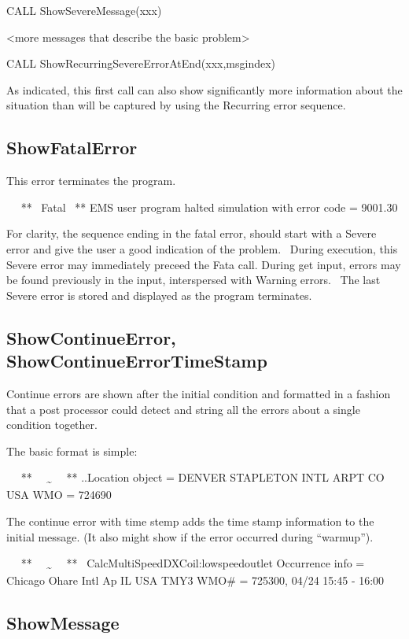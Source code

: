 CALL ShowSevereMessage(xxx)

\textless{}more messages that describe the basic problem\textgreater{}

CALL ShowRecurringSevereErrorAtEnd(xxx,msgindex)

As indicated, this first call can also show significantly more information about the situation than will be captured by using the Recurring error sequence.

\subsection{ShowFatalError}\label{showfatalerror}

This error terminates the program.

~~ **~ Fatal~ ** EMS user program halted simulation with error code = 9001.30

For clarity, the sequence ending in the fatal error, should start with a Severe error and give the user a good indication of the problem.~ During execution, this Severe error may immediately preceed the Fata call. During get input, errors may be found previously in the input, interspersed with Warning errors.~ The last Severe error is stored and displayed as the program terminates.

\subsection{ShowContinueError, ShowContinueErrorTimeStamp}\label{showcontinueerror-showcontinueerrortimestamp}

Continue errors are shown after the initial condition and formatted in a fashion that a post processor could detect and string all the errors about a single condition together.

The basic format is simple:

~~ **~~ \textsubscript{\textasciitilde{}}~~ ** ..Location object = DENVER STAPLETON INTL ARPT CO USA WMO = 724690

The continue error with time stemp adds the time stamp information to the initial message. (It also might show if the error occurred during ``warmup'').

~~ **~~ \textsubscript{\textasciitilde{}}~~ **~ CalcMultiSpeedDXCoil:lowspeedoutlet Occurrence info = Chicago Ohare Intl Ap IL USA TMY3 WMO\# = 725300, 04/24 15:45 - 16:00

\subsection{ShowMessage}\label{showmessage}

